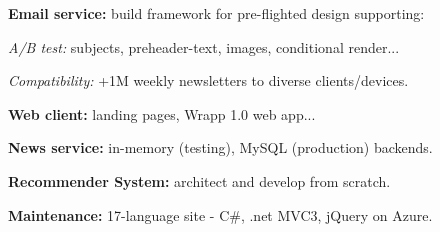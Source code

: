 \documentclass[a4paper]{MagicalCV}
\begin{document}
\begin{minipage}[t]{0.66\textwidth}
\hfill
{}
\vspace{\topsep} %
\begin{tightemize}
\item {\bf Email service:} build framework for pre-flighted design supporting:
\begin{tightemize}
\item {\it A/B test:} subjects, preheader-text, images, conditional render...
\item {\it Compatibility:} +1M weekly newsletters to diverse clients/devices.
\end{tightemize}
\item {\bf Web client:} landing pages, Wrapp 1.0 web app...
\end{tightemize}
\sectionsep

\hfill
{}
\vspace{\topsep} %
\begin{tightemize}
\item {\bf News service:} in-memory (testing), MySQL (production) backends.
\item {\bf Recommender System:} architect and develop from scratch.
\end{tightemize}
\sectionsep

\hfill
{}
\vspace{\topsep} %
\begin{tightemize}
\item {\bf Maintenance:} 17-language site - C\#, .net MVC3, jQuery on Azure.
\end{tightemize}
\sectionsep

\end{minipage}
\end{document}
